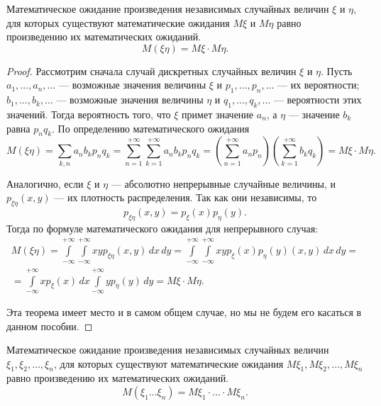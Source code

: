 \begin{thm}[мультипликативность]
Математическое ожидание произведения независимых случайных величин $\xi$ и $\eta$, для которых существуют математические ожидания $M\xi$ и $M\eta$ равно произведению их математических ожиданий.
$$
M (\xi\eta)=M\xi\cdot M\eta.
$$
\end{thm}
\begin{proof}
Рассмотрим сначала случай дискретных случайных величин $\xi$ и $\eta$. Пусть $a_1,\dots,a_n,\dots$ --- возможные значения величины $\xi$ и $p_1,\dots,p_n,\dots$ --- их вероятности; $b_1,\dots,b_k,\dots$ --- возможные значения величины $\eta$ и $q_1,\dots,q_k,\dots$ --- вероятности этих значений. Тогда вероятность того, что $\xi$ примет значение $a_n$, а $\eta$ --- значение $b_k$ равна $p_n q_k$. По определению математического ожидания 
$$
M(\xi\eta)=\sum\limits_{k,n}a_n b_k p_n q_k = \sum\limits_{n=1}^{+\infty}\sum\limits_{k=1}^{+\infty} a_n b_k p_n q_k =\left(\sum\limits_{n=1}^{+\infty}a_n p_n\right)\left(\sum\limits_{k=1}^{+\infty}b_k q_k\right)=M\xi\cdot M\eta.
$$

Аналогично, если $\xi$ и $\eta$ --- абсолютно непрерывные случайные величины, и $p_{\xi\eta}(x,y)$ --- их плотность распределения. Так как они независимы, то
$$
p_{\xi\eta}(x,y)=p_\xi(x)p_\eta(y).
$$
Тогда по формуле математического ожидания для непрерывного случая:
\begin{multline*}
M(\xi\eta)=\int\limits_{-\infty}^{+\infty}\int\limits_{-\infty}^{+\infty}xyp_{\xi\eta}(x,y)\,dx\,dy=\int\limits_{-\infty}^{+\infty}\int\limits_{-\infty}^{+\infty}xyp_\xi(x)p_\eta(y)(x,y)\,dx\,dy=\\=\int\limits_{-\infty}^{+\infty}xp_\xi(x)\,dx\int\limits_{-\infty}^{+\infty}yp_\eta(y)\,dy=M\xi\cdot M\eta.
\end{multline*}

Эта теорема имеет место и в самом общем случае, но мы не будем его касаться в данном пособии.
\end{proof}
\begin{cons}
Математическое ожидание произведения независимых случайных величин $\xi_1,\xi_2,\dots, \xi_n$, для которых существуют математические ожидания $M\xi_1,M\xi_2,\dots, M\xi_n$ равно произведению их математических ожиданий.
$$
M (\xi_1\dots\xi_n)=M\xi_1\cdot\dots\cdot M\xi_n.
$$
\end{cons}

